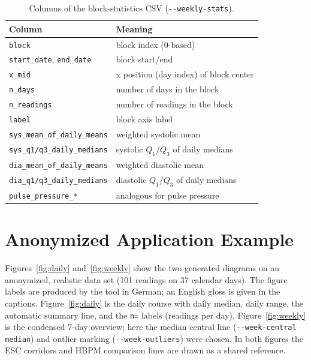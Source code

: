 \documentclass[conference]{IEEEtran}
\newcommand{\param}[1]{\texttt{#1}}
\begin{document}
\begin{table}[!t]
\caption{Columns of the block-statistics CSV (\texttt{-{}-weekly-stats}).}
\label{tab:weekly_cols}
\centering
\footnotesize
\renewcommand{\arraystretch}{1.15}
\begin{tabular}{>{\raggedright\arraybackslash}p{} >{\raggedright\arraybackslash}p{}}
\toprule
\textbf{Column} & \textbf{Meaning} \\
\midrule
\texttt{block} & block index (0-based) \\
\texttt{start\_date}, \texttt{end\_date} & block start/end \\
\texttt{x\_mid} & x position (day index) of block center \\
\texttt{n\_days} & number of days in the block \\
\texttt{n\_readings} & number of readings in the block \\
\texttt{label} & block axis label \\
\texttt{sys\_mean\_of\_daily\_means} & weighted systolic mean \\
\texttt{sys\_q1/q3\_daily\_medians} & systolic $Q_1$/$Q_3$ of daily medians \\
\texttt{dia\_mean\_of\_daily\_means} & weighted diastolic mean \\
\texttt{dia\_q1/q3\_daily\_medians} & diastolic $Q_1$/$Q_3$ of daily medians \\
\texttt{pulse\_pressure\_*} & analogous for pulse pressure \\
\bottomrule
\end{tabular}
\end{table}

\section{Anonymized Application Example}
Figures~\ref{fig:daily} and~\ref{fig:weekly} show the two generated diagrams on
an anonymized, realistic data set (101 readings on 37 calendar days). The figure
labels are produced by the tool in German; an English gloss is given in the
captions. Figure~\ref{fig:daily} is the daily course with daily median, daily
range, the automatic summary line, and the \texttt{n=} labels (readings per
day). Figure~\ref{fig:weekly} is the condensed 7-day overview; here the median
central line (\param{-{}-week-central median}) and outlier marking
(\param{-{}-week-outliers}) were chosen. In both figures the ESC corridors and
HBPM comparison lines are drawn as a shared reference.
\end{document}
